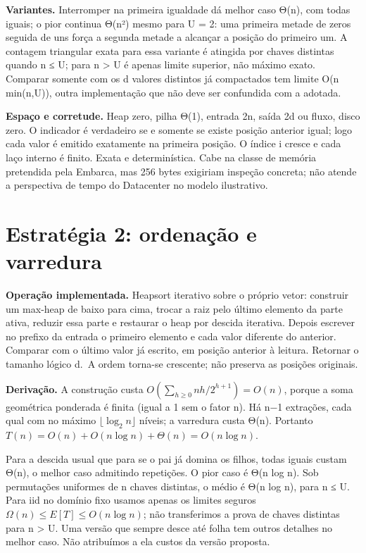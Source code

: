 \documentclass[
  brazilian,
  11pt,
  a4paper,
]{article}
\let\oldsection\section
\renewcommand{\section}{\Needspace{6\baselineskip}\oldsection}
\begin{document}
\textbf{Variantes.} Interromper na primeira igualdade dá melhor caso
Θ(n), com todas iguais; o pior continua Θ(n²) mesmo para U = 2: uma
primeira metade de zeros seguida de uns força a segunda metade a
alcançar a posição do primeiro um. A contagem triangular exata para essa
variante é atingida por chaves distintas quando n ≤ U; para n
\textgreater{} U é apenas limite superior, não máximo exato. Comparar
somente com os d valores distintos já compactados tem limite O(n
min(n,U)), outra implementação que não deve ser confundida com a
adotada.

\textbf{Espaço e corretude.} Heap zero, pilha Θ(1), entrada 2n, saída 2d
ou fluxo, disco zero. O indicador é verdadeiro se e somente se existe
posição anterior igual; logo cada valor é emitido exatamente na primeira
posição. O índice i cresce e cada laço interno é finito. Exata e
determinística. Cabe na classe de memória pretendida pela Embarca, mas
256 bytes exigiriam inspeção concreta; não atende a perspectiva de tempo
do Datacenter no modelo ilustrativo.

\section{Estratégia 2: ordenação e
varredura}\label{estratuxe9gia-2-ordenauxe7uxe3o-e-varredura}

\textbf{Operação implementada.} Heapsort iterativo sobre o próprio
vetor: construir um max-heap de baixo para cima, trocar a raiz pelo
último elemento da parte ativa, reduzir essa parte e restaurar o heap
por descida iterativa. Depois escrever no prefixo da entrada o primeiro
elemento e cada valor diferente do anterior. Comparar com o último valor
já escrito, em posição anterior à leitura. Retornar o tamanho lógico
d.~A ordem torna-se crescente; não preserva as posições originais.

\textbf{Derivação.} A construção custa
\(O(\sum_{h\ge0}nh/2^{h+1})=O(n)\), porque a soma geométrica ponderada é
finita (igual a 1 sem o fator n). Há n−1 extrações, cada qual com no
máximo \(\lfloor\log_2 n\rfloor\) níveis; a varredura custa Θ(n).
Portanto \(T(n)=O(n)+O(n\log n)+\Theta(n)=O(n\log n)\).

Para a descida usual que para se o pai já domina os filhos, todas iguais
custam Θ(n), o melhor caso admitindo repetições. O pior caso é Θ(n log
n). Sob permutações uniformes de n chaves distintas, o médio é Θ(n log
n), para n ≤ U. Para iid no domínio fixo usamos apenas os limites
seguros \(\Omega(n)\le E[T]\le O(n\log n)\); não transferimos a prova de
chaves distintas para n \textgreater{} U. Uma versão que sempre desce
até folha tem outros detalhes no melhor caso. Não atribuímos a ela
custos da versão proposta.
\end{document}
